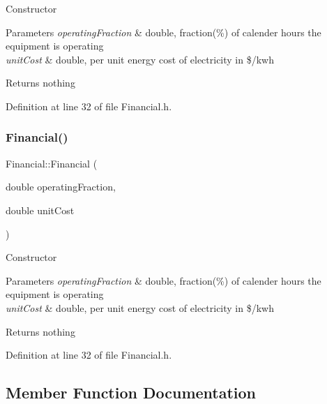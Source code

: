Constructor 
\begin{DoxyParams}{Parameters}
{\em operating\+Fraction} & double, fraction(\%) of calender hours the equipment is operating \\
\hline
{\em unit\+Cost} & double, per unit energy cost of electricity in \$/kwh \\
\hline
\end{DoxyParams}
\begin{DoxyReturn}{Returns}
nothing 
\end{DoxyReturn}


Definition at line 32 of file Financial.\+h.

\mbox{\label{class_financial_abe8c4d82e9aede125e7e42ad3d53f90a}} 
\subsubsection{\texorpdfstring{Financial()}{Financial()}\hspace{0.1cm}{\footnotesize\ttfamily [3/3]}}
{\footnotesize\ttfamily Financial\+::\+Financial (\begin{DoxyParamCaption}\item[{double}]{operating\+Fraction,  }\item[{double}]{unit\+Cost }\end{DoxyParamCaption})\hspace{0.3cm}{\ttfamily [inline]}}

Constructor 
\begin{DoxyParams}{Parameters}
{\em operating\+Fraction} & double, fraction(\%) of calender hours the equipment is operating \\
\hline
{\em unit\+Cost} & double, per unit energy cost of electricity in \$/kwh \\
\hline
\end{DoxyParams}
\begin{DoxyReturn}{Returns}
nothing 
\end{DoxyReturn}


Definition at line 32 of file Financial.\+h.



\subsection{Member Function Documentation}
\mbox{\label{class_financial_a650ee2678b49d8d19b541f15d5a37c05}} 
